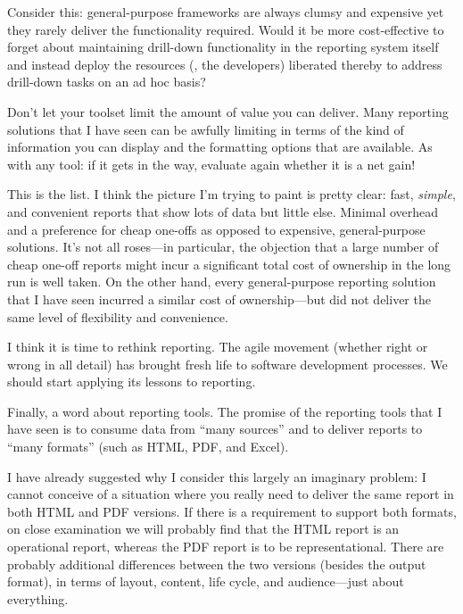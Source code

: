 Consider this: general-purpose frameworks are always clumsy and
expensive yet they rarely deliver the functionality required.  Would
it be more cost-effective to forget about maintaining drill-down
functionality in the reporting system itself and instead deploy the
resources (\ie, the developers) liberated thereby to address
drill-down tasks on an ad hoc basis?

Don't let your toolset limit the amount of value you can deliver.
Many reporting solutions that I have seen can be awfully limiting in
terms of the kind of information you can display and the formatting
options that are available. As with any tool: if it gets in the way, evaluate again
whether it is a net gain!

This is the list. I think the picture I'm trying to paint is pretty
clear: fast, \emph{simple}, and convenient reports that show lots of
data but little else. Minimal overhead and a preference for cheap
one-offs as opposed to expensive, general-purpose solutions. It's not
all roses---in particular, the objection that a large number of cheap
one-off reports might incur a significant total cost of ownership in
the long run is well taken. On the other hand, every general-purpose
reporting solution that I have seen incurred a similar cost of
ownership---but did not deliver the same level of flexibility and
convenience.

I think it is time to rethink reporting. The agile movement (whether
right or wrong in all detail) has brought fresh life to software
development processes. We should start applying its lessons to
reporting.

Finally, a word about reporting tools. The promise of the reporting
tools that I have seen is to consume data from ``many sources'' and to
deliver reports to ``many formats'' (such as HTML, PDF, and Excel).

I have already suggested why I consider this largely an imaginary
problem: I cannot conceive of a situation where you really need to
deliver the same report in both HTML and PDF versions. If there is a
requirement to support both formats, on close examination we will
probably find that the HTML report is an operational report, whereas
the PDF report is to be representational. There are probably additional
differences between the two versions (besides the output format), in
terms of layout, content, life cycle, and audience---just about
everything.


